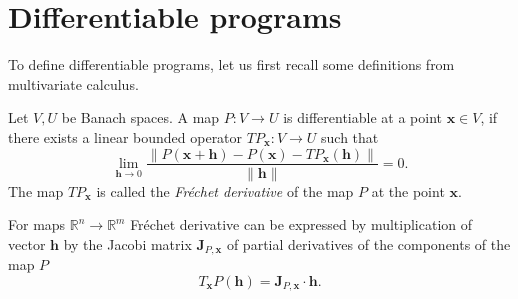 \documentclass[smallcondensed]{svjour3}
\newcommand{\RR}{\mathbb{R}}
\newcommand{\x}{\mathbf{x}}
\newcommand{\h}{\mathbf{h}}
\begin{document}
\section{Differentiable programs}
To define differentiable programs, let us first recall some
definitions from multivariate calculus.
\begin{definition}[Derivative]
  Let $V,U$ be Banach spaces. A map $P:V\to U$ is differentiable at a point
  $\x\in V$, if there exists a linear bounded operator $TP_\x:V\to U$ such that
  \begin{equation}
    \label{eq:frechet}
    \lim_{\h\to 0}\frac{\|P(\x+\h)-P(\x)-TP_\x(\h)\|}{\|\h\|} = 0.
  \end{equation}
  The map $TP_\x$ is called the \emph{Fréchet derivative} of the map $P$ at the
  point $\x$.
\end{definition}
For maps $\RR^n\to \RR^m$ Fréchet derivative can be expressed by multiplication
of vector $\h$ by the Jacobi matrix $\mathbf{J}_{P,\x}$ of partial
derivatives of the components of the map $P$
\begin{equation*}
  T_\x P(\h) = \mathbf{J}_{P,\x}\cdot \h.
\end{equation*}
\end{document}
